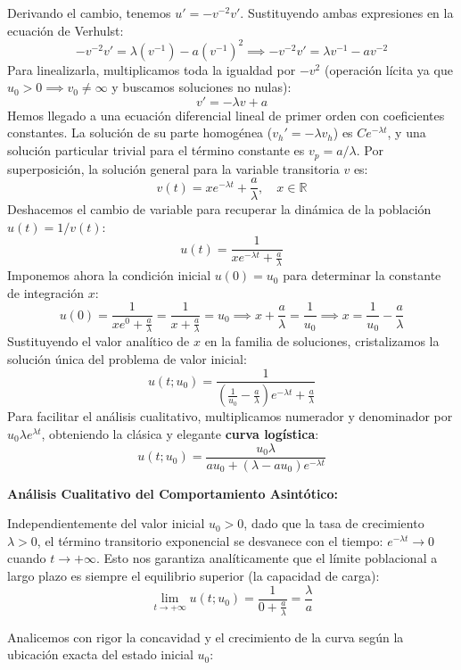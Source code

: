 {    Derivando el cambio, tenemos $u' = -v^{-2} v'$. Sustituyendo ambas expresiones en la ecuación de Verhulst:
    \[
        -v^{-2} v' = \lambda (v^{-1}) - a (v^{-1})^2 \implies -v^{-2} v' = \lambda v^{-1} - a v^{-2}
    \]
    Para linealizarla, multiplicamos toda la igualdad por $-v^2$ (operación lícita ya que $u_0 > 0 \implies v_0 \neq \infty$ y buscamos soluciones no nulas):
    \[
        v' = -\lambda v + a
    \]
    Hemos llegado a una ecuación diferencial lineal de primer orden con coeficientes constantes. La solución de su parte homogénea ($v_h' = -\lambda v_h$) es $C e^{-\lambda t}$, y una solución particular trivial para el término constante es $v_p = a/\lambda$. Por superposición, la solución general para la variable transitoria $v$ es:
    \[
        v(t) = x e^{-\lambda t} + \frac{a}{\lambda}, \quad x \in \mathbb{R}
    \]
    Deshacemos el cambio de variable para recuperar la dinámica de la población $u(t) = 1/v(t)$:
    \[
        u(t) = \frac{1}{x e^{-\lambda t} + \frac{a}{\lambda}} 
    \]
    Imponemos ahora la condición inicial $u(0) = u_0$ para determinar la constante de integración $x$:
    \[
        u(0) = \frac{1}{x e^{0} + \frac{a}{\lambda}} = \frac{1}{x + \frac{a}{\lambda}} = u_0 \implies x + \frac{a}{\lambda} = \frac{1}{u_0} \implies x = \frac{1}{u_0} - \frac{a}{\lambda}
    \]
    Sustituyendo el valor analítico de $x$ en la familia de soluciones, cristalizamos la solución única del problema de valor inicial:
    \[
        u(t; u_0) = \frac{1}{\left( \frac{1}{u_0} - \frac{a}{\lambda} \right) e^{-\lambda t} + \frac{a}{\lambda}}
    \]
    Para facilitar el análisis cualitativo, multiplicamos numerador y denominador por $u_0 \lambda e^{\lambda t}$, obteniendo la clásica y elegante \textbf{curva logística}:
    \[
        u(t; u_0) = \frac{u_0 \lambda}{a u_0 + (\lambda - a u_0)e^{-\lambda t}}
    \]

    \textbf{Análisis Cualitativo del Comportamiento Asintótico:}
    
    Independientemente del valor inicial $u_0 > 0$, dado que la tasa de crecimiento $\lambda > 0$, el término transitorio exponencial se desvanece con el tiempo: $e^{-\lambda t} \to 0$ cuando $t \to +\infty$. Esto nos garantiza analíticamente que el límite poblacional a largo plazo es siempre el equilibrio superior (la capacidad de carga):
    \[ \lim_{t \to +\infty} u(t; u_0) = \frac{1}{0 + \frac{a}{\lambda}} = \frac{\lambda}{a} \]
    
    Analicemos con rigor la concavidad y el crecimiento de la curva según la ubicación exacta del estado inicial $u_0$:
    
}
